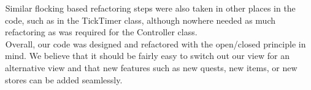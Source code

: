 \documentclass[letter paper, 12pt]{article}
\newcommand{\tab}{${}_{}$\hspace{0.2in}}
\begin{document}
\tab Similar flocking based refactoring steps were also taken in other places in the code, such as in the TickTimer class, although nowhere needed as much refactoring as was required for the Controller class.\\
\tab Overall, our code was designed and refactored with the open/closed principle in mind. We believe that it should be fairly easy to switch out our view for an alternative view and that new features such as new quests, new items, or new stores can be added seamlessly. 
\end{document}
